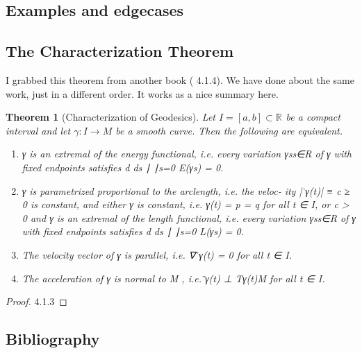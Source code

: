 \documentclass{article}
\newtheorem{thm}{Theorem}
\newtheorem{proof}{Proof}
\newtheorem*{variants}{}
\newtheorem*{var}{}
\renewcommand{\Rn}[1][n]{\mathbb{R}^{#1}}
\begin{document}
\subsection{Examples and edgecases}




\subsection{The Characterization Theorem}

I grabbed this theorem from another book (\cite{salamon} 4.1.4).
We have done about the same work, just in a different order.
It works as a nice summary here.

\begin{thm}[Characterization of Geodesics]
    Let $I = [a, b] \subset \Rn[]$ be a compact interval and let $\gamma : I \rightarrow M$ be a
    smooth curve. Then the following are equivalent.
    \begin{enumerate}
    \item γ is an extremal of the energy functional, i.e. every variation {γs}s∈R
        of γ with fixed endpoints satisfies
        d
        ds
        ∣
        ∣s=0 E(γs) = 0.
    \item γ is parametrized proportional to the arclength, i.e. the veloc-
        ity |  ̇γ(t)| ≡ c ≥ 0 is constant, and either γ is constant, i.e. γ(t) = p = q for
        all t ∈ I, or c > 0 and γ is an extremal of the length functional, i.e.
        every variation {γs}s∈R of γ with fixed endpoints satisfies
        d
        ds
        ∣
        ∣s=0 L(γs) = 0.
    \item The velocity vector of γ is parallel, i.e. ∇  ̇γ(t) = 0 for all t ∈ I.
    \item The acceleration of γ is normal to M , i.e.  ̈γ(t) ⊥ Tγ(t)M for all t ∈ I.
    \end{enumerate}
\end{thm}


\begin{proof}
    \cite{salamon} 4.1.3
\end{proof}


\subsection{Bibliography}

\printbibliography
\end{document}

